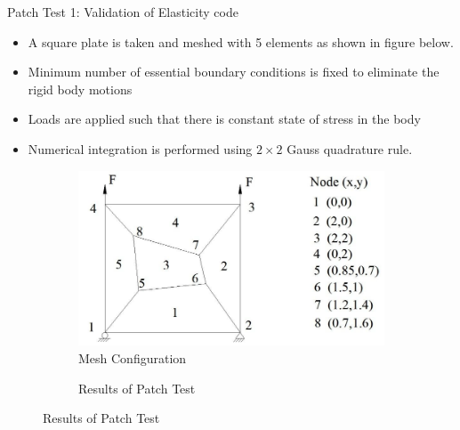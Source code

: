 \documentclass{beamer}
\begin{document}
\begin{frame}[t,fragile]{Patch Test 1: Validation of Elasticity code}
    \vspace{-.4cm}
    \footnotesize
 \begin{itemize}
       \item A square plate is taken and meshed with 5 elements as shown in figure below. 
           \item Minimum number of essential boundary conditions is fixed to eliminate the rigid body motions
           \item Loads are applied such that there is constant state of stress in the body
           \item Numerical integration is performed using $2\times 2$ Gauss quadrature rule.
   \end{itemize}
   \vspace{-.5cm}
    \begin{figure}
\begin{subfigure}{0.45\textwidth}
    \centering
      \includegraphics[scale=.2]{image2}
    \caption{\scriptsize Mesh Configuration }
\end{subfigure}
\begin{subfigure}{0.45\textwidth}
     \centering  
\caption{\scriptsize Results of Patch Test }
\end{subfigure}
\end{figure}
\end{frame}
\end{document}
